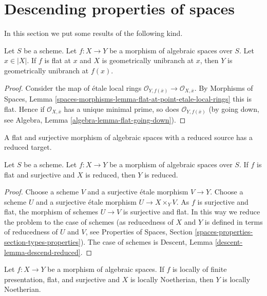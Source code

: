 \section{Descending properties of spaces}
\label{section-descending-properties-spaces}

\noindent
In this section we put some results of the following kind.

\begin{lemma}
\label{lemma-descend-unibranch}
Let $S$ be a scheme.
Let $f : X \to Y$ be a morphism of algebraic spaces over $S$.
Let $x \in |X|$.
If $f$ is flat at $x$ and $X$ is geometrically unibranch at $x$, then $Y$ is
geometrically unibranch at $f(x)$.
\end{lemma}

\begin{proof}
Consider the map of \'etale local rings
$\mathcal{O}_{Y, f(\overline{x})} \to \mathcal{O}_{X, \overline{x}}$.
By
Morphisms of Spaces, Lemma
\ref{spaces-morphisms-lemma-flat-at-point-etale-local-rings}
this is flat. Hence if $\mathcal{O}_{X, \overline{x}}$ has a unique minimal
prime, so does $\mathcal{O}_{Y, f(\overline{x})}$ (by going down, see
Algebra, Lemma \ref{algebra-lemma-flat-going-down}).
\end{proof}

\begin{lemma}
\label{lemma-descend-reduced}
\begin{slogan}
A flat and surjective morphism of algebraic spaces with a reduced source
has a reduced target.
\end{slogan}
Let $S$ be a scheme.
Let $f : X \to Y$ be a morphism of algebraic spaces over $S$.
If $f$ is flat and surjective and $X$ is reduced, then $Y$ is reduced.
\end{lemma}

\begin{proof}
Choose a scheme $V$ and a surjective \'etale morphism $V \to Y$.
Choose a scheme $U$ and a surjective \'etale morphism
$U \to X \times_Y V$. As $f$ is surjective and flat, the morphism of
schemes $U \to V$ is surjective and flat. In this way we reduce the
problem to the case of schemes (as reducedness of $X$ and $Y$ is defined
in terms of reducedness of $U$ and $V$, see
Properties of Spaces,
Section \ref{spaces-properties-section-types-properties}).
The case of schemes is
Descent, Lemma \ref{descent-lemma-descend-reduced}.
\end{proof}

\begin{lemma}
\label{lemma-descend-locally-Noetherian}
Let $f : X \to Y$ be a morphism of algebraic spaces.
If $f$ is locally of finite presentation, flat, and surjective and
$X$ is locally Noetherian, then $Y$ is locally Noetherian.
\end{lemma}

